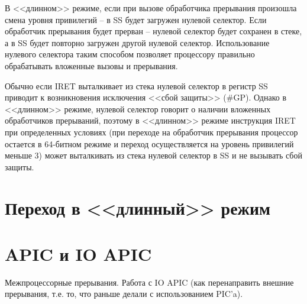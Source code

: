 В <<длинном>> режиме, если при вызове обработчика прерывания произошла смена
уровня привилегий -- в SS будет загружен нулевой селектор. Если обработчик
прерывания будет прерван -- нулевой селектор будет сохранен в стеке, а в SS
будет повторно загружен другой нулевой селектор. Использование нулевого
селектора таким способом позволяет процессору правильно обрабатывать вложенные
вызовы и прерывания.

Обычно если IRET выталкивает из стека нулевой селектор в регистр SS приводит к
возникновения исключения <<сбой защиты>> (\#GP). Однако в <<длинном>> режиме,
нулевой селектор говорит о наличии вложенных обработчиков прерываний, поэтому
в <<длинном>> режиме инструкция IRET при определенных условиях (при переходе
на обработчик прерывания процессор остается в 64-битном режиме и переход
осуществляется на уровень привилегий меньше 3) может
выталкивать из стека нулевой селектор в SS и не вызывать сбой защиты.

\section{Переход в <<длинный>> режим}
\label{sec:long_mode_activation}

\section{APIC и IO APIC}
Межпроцессорные прерывания. Работа с IO APIC (как перенаправить внешние
прерывания, т.е. то, что раньше делали с использованием PIC'a).

